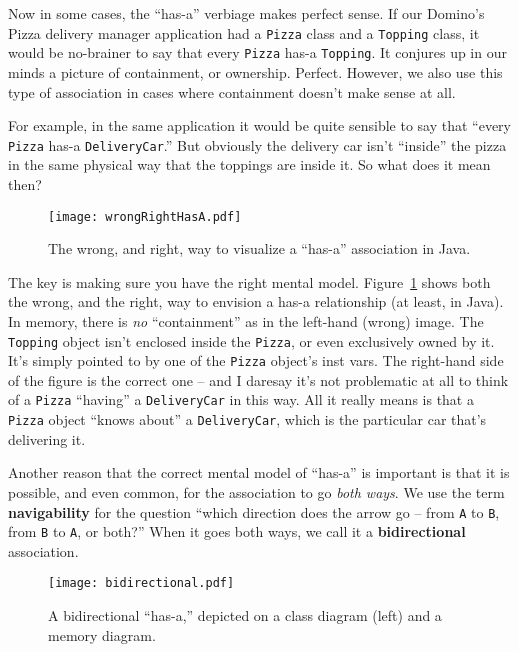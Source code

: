 Now in some cases, the ``has-a'' verbiage makes perfect sense. If our Domino's
Pizza delivery manager application had a \texttt{Pizza} class and a
\texttt{Topping} class, it would be no-brainer to say that every
\texttt{Pizza} has-a \texttt{Topping}. It conjures up in our minds a picture
of containment, or ownership. Perfect. However, we also use this type of
association in cases where containment doesn't make sense at all.

For example, in the same application it would be quite sensible to say that
``every \texttt{Pizza} has-a \texttt{DeliveryCar}.'' But obviously the delivery
car isn't ``inside'' the pizza in the same physical way that the toppings are
inside it. So what does it mean then?

\begin{figure}[ht]
\centering
\texttt{[image: wrongRightHasA.pdf]}   %
\caption{The wrong, and right, way to visualize a ``has-a'' association in
Java.}
\label{fig:wrongRightHasA}
\end{figure}

The key is making sure you have the right mental model.
Figure~\ref{fig:wrongRightHasA} shows both the wrong, and the right, way to
envision a has-a relationship (at least, in Java). In memory, there is
\textit{no} ``containment'' as in the left-hand (wrong) image. The
\texttt{Topping} object isn't enclosed inside the \texttt{Pizza}, or even
exclusively owned by it. It's simply pointed to by one of the \texttt{Pizza}
object's inst vars. The right-hand side of the figure is the correct one --
and I daresay it's not problematic at all to think of a \texttt{Pizza}
``having'' a \texttt{DeliveryCar} in this way. All it really means is that a
\texttt{Pizza} object ``knows about'' a \texttt{DeliveryCar}, which is the
particular car that's delivering it.

Another reason that the correct mental model of ``has-a'' is important is that
it is possible, and even common, for the association to go \textit{both ways}.
We use the term \textbf{navigability} for the question ``which direction does
the arrow go -- from \texttt{A} to \texttt{B}, from \texttt{B} to \texttt{A},
or both?'' When it goes both ways, we call it a \textbf{bidirectional}
association.

\begin{figure}[ht]
\centering
\texttt{[image: bidirectional.pdf]}   %
\caption{A bidirectional ``has-a,'' depicted on a class diagram (left) and a
memory diagram.}
\label{fig:bidirectional}
\end{figure}

